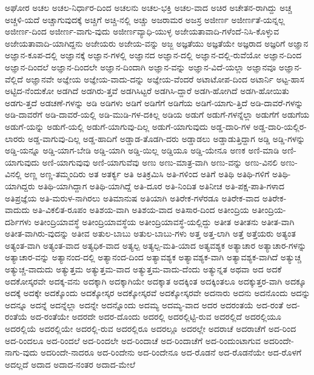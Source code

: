{ಅಘೋರ
ಅಚಲ
ಅಚಲ-ನಿರ್ಧಾರ-ದಿಂದ
ಅಚಲನು
ಅಚಲ-ಭಕ್ತಿ
ಅಚಲ-ವಾದ
ಅಚಿರ
ಅಚೇತನ-ರಾಗಿದ್ದು
ಅಚ್ಚ
ಅಚ್ಚಳಿ-ಯದೆ
ಅಚ್ಚಾಗುವುದಕ್ಕೆ
ಅಚ್ಚಿಗೆ
ಅಚ್ಚಿ-ನಲ್ಲಿ
ಅಚ್ಚು
ಅಜರಾಮರ
ಅಜಸ್ರ
ಅಜೀರ್ಣ
ಅಜೀರ್ಣತೆ-ಯನ್ನಲ್ಲ
ಅಜೀರ್ಣ-ದಿಂದ
ಅಜೀರ್ಣ-ವಾಗು-ವುದು
ಅಜೀರ್ಣವ್ಯಾಧಿ-ಯುಳ್ಳ
ಅಜೇಯತಾವಾದಿ-ಗಳೆಂದೆ-ನಿಸಿ-ಕೊಳ್ಳುವ
ಅಜೇಯತಾವಾದಿ-ಯಾಗಿದ್ದನು
ಅಜೇಯರು
ಅಜೇಯ-ವನ್ನು
ಅಜ್ಜ
ಅಜ್ಞತೆಯು
ಅಜ್ಞತೆಯೇ
ಅಜ್ಞರಾದ
ಅಜ್ಞರಿಗೆ
ಅಜ್ಞಾನ
ಅಜ್ಞಾನ-ಕೂಪ-ದಲ್ಲಿ
ಅಜ್ಞಾನಕ್ಕೆ
ಅಜ್ಞಾನ-ಗಳಲ್ಲಿ
ಅಜ್ಞಾನದ
ಅಜ್ಞಾನ-ದಲ್ಲಿ
ಅಜ್ಞಾನ-ದಲ್ಲಿ-ರುವೆಯೋ
ಅಜ್ಞಾನ-ದಿಂದ
ಅಜ್ಞಾನ-ದಿಂದಲೆ
ಅಜ್ಞಾನ-ದಿಂದಲೇ
ಅಜ್ಞಾನ-ದಿಂದಾಗಿ
ಅಜ್ಞಾನ-ವನ್ನು
ಅಜ್ಞಾನ-ವಿದೆ-ಯಲ್ಲಾ
ಅಜ್ಞಾನವೂ
ಅಜ್ಞಾನ-ವೆಲ್ಲಿದೆ
ಅಜ್ಞಾನವೇ
ಅಜ್ಞೇಯ
ಅಜ್ಞೇಯ-ವಾದು-ದನ್ನು
ಅಜ್ಞೇಯ-ವೆಂದರೆ
ಅಟಾಟೋಪ-ದಿಂದ
ಅಟಾರ್ನಿ
ಅಟ್ಟ-ಹಾಸ
ಅಟ್ಟಿದ-ನೆಂದುಕೋ
ಅಡಗಿದೆ
ಅಡಗಿರು-ತ್ತವೆ
ಅಡಗಿಸಿಟ್ಟರೆ
ಅಡಗಿಸಿ-ದ್ದಾರೆ
ಅಡಗಿ-ಹೋಗಿದೆ
ಅಡಗಿ-ಹೋಯಿತು
ಅಡಗು-ತ್ತದೆ
ಅಡಚಣೆ-ಗಳನ್ನು
ಅಡಿ
ಅಡಿಗಳು
ಅಡಿಗೆ
ಅಡಿಗೆಗೆ
ಅಡಿಗೆಯ
ಅಡಿಗೆ-ಯಾಗು-ತ್ತಿದೆ
ಅಡಿ-ದಾವರೆ-ಗಳನ್ನು
ಅಡಿ-ದಾವರೆಗೆ
ಅಡಿ-ದಾವರೆ-ಯಲ್ಲಿ
ಅಡಿ-ಮುಡಿ-ಗಳ-ದಕಿಲ್ಲ
ಅಡಿಯ
ಅಡುಗೆ
ಅಡುಗೆ-ಗಳನ್ನೆಲ್ಲಾ
ಅಡುಗೆಗೆ
ಅಡುಗೆಯ
ಅಡುಗೆ-ಯನ್ನು
ಅಡುಗೆ-ಯಲ್ಲಿ
ಅಡುಗೆ-ಯಾಗುವು-ದಿಲ್ಲ
ಅಡುಗೆ-ಯಾಗುವುದು
ಅಡ್ಡ-ದಾರಿ-ಗಳ
ಅಡ್ಡ-ದಾರಿ-ಯಲ್ಲಿರ-ಲಾರರು
ಅಡ್ಡ-ವಾಗುವು-ದಿಲ್ಲ
ಅಡ್ಡ-ಹಾದಿಗೆ
ಅಡ್ಡಾಡ-ತೊಡಗಿ-ದರು
ಅಡ್ಡಾಡಲು
ಅಡ್ಡಾಡುತ್ತಿದ್ದಾಗ
ಅಡ್ಡಿ
ಅಡ್ಡಿ-ಗಳನ್ನು
ಅಡ್ಡಿ-ಯನ್ನೂ
ಅಡ್ಡಿ-ಯಾಗ-ಬೇಡಿ
ಅಡ್ಡಿ-ಯಾಗಿ
ಅಡ್ಡಿ-ಯಿಲ್ಲ
ಅಡ್ಡಿಯೂ
ಅಡ್ಡಿ-ಯೇನೂ
ಅಣಕ
ಅಣಿ-ಮಾಡಿ
ಅಣಿ-ಯಾಗುವುದು
ಅಣಿ-ಯಾಗುವುವು
ಅಣಿ-ಯಾಗುವೆವು
ಅಣು
ಅಣು-ಮಾತ್ರ-ವಾಗಿ
ಅಣು-ವನ್ನು
ಅಣು-ವಿನಲಿ
ಅಣು-ವಿನಲ್ಲಿ
ಅಣ್ಣ
ಅಣ್ಣ-ತಮ್ಮಂದಿರು
ಅತ
ಅತರ್ಕ್ಯ
ಅತಿ
ಅತಿಕ್ರಮಿಸಿ
ಅತಿ-ಗಳಿಂದ
ಅತಿಗೆ
ಅತಿಥಿ
ಅತಿಥಿ-ಗಳಿಗೆ
ಅತಿಥಿ-ಯಾಗಿದ್ದರು
ಅತಿಥಿ-ಯಾಗಿದ್ದಾಗ
ಅತಿಥಿ-ಯಾಗಿದ್ದೆ
ಅತಿ-ದೂರ
ಅತಿ-ನಿಂದಿತ
ಅತಿನೀಚ
ಅತಿ-ಪಕ್ಷ-ಪಾತಿ-ಗಳಾದ
ಅತಿಪ್ರಜ್ಞೆಯ
ಅತಿ-ಮರುಳ-ನಾಗಿರಲು
ಅತಿಮಾನುಷ
ಅತಿಯಾಗಿ
ಅತಿರೇಕ-ಗಳೆರಡೂ
ಅತಿರೇಕ-ವಾದ
ಅತಿರೇಕ-ವಾದುದು
ಅತಿ-ವಿಕಲಿತ-ರೂಪಂ
ಅತಿಶಯ-ವಾಗಿ
ಅತಿಶಯ-ವಾದ
ಅತಿಸಾರ-ದಿಂದ
ಅತೀಂದ್ರಿಯ
ಅತೀಂದ್ರಿಯ-ದರ್ಶಿಗಳು
ಅತೀಂದ್ರಿಯಾವಸ್ಥೆ
ಅತೀಂದ್ರಿಯಾವಸ್ಥೆಯ
ಅತೀಂದ್ರಿಯಾವಸ್ಥೆ-ಯಲ್ಲಿದ್ದು
ಅತೀತ
ಅತೀತನು
ಅತೀತ-ವಾಗಿ
ಅತೀತ-ವಾಗಿರು-ವುದನ್ನು
ಅತೀವ
ಅತುಲ-ಬಾಬು
ಅತುಲ-ಬಾಬು-ಗಳು
ಅತ್ತ
ಅತ್ತ-ಲಾಗಿ
ಅತ್ತೆ
ಅತ್ತೆಯರು
ಅತ್ಯಂತ
ಅತ್ಯಂತ-ವಾಗಿ
ಅತ್ಯಂತ-ವಾದ
ಅತ್ಯಧಿಕ-ವಾದ
ಅತ್ಯಲ್ಪ
ಅತ್ಯಲ್ಪ-ಮತಿ-ಯಾದ
ಅತ್ಯವಶ್ಯಕ
ಅತ್ಯಾಚಾರ
ಅತ್ಯಾಚಾರ-ಗಳನ್ನು
ಅತ್ಯಾಚಾರ-ವನ್ನು
ಅತ್ಯಾನಂದ-ದಲ್ಲಿ
ಅತ್ಯಾನಂದ-ದಿಂದ
ಅತ್ಯಾವಶ್ಯಕ
ಅತ್ಯಾವಶ್ಯಕ-ವಾಗಿ
ಅತ್ಯಾವಶ್ಯಕ-ವಾಗಿದೆ
ಅತ್ಯುಚ್ಚ
ಅತ್ಯುಚ್ಚ-ವಾದುದು
ಅತ್ಯುತ್ತಮ
ಅತ್ಯುತ್ತಮ-ವಾದ
ಅತ್ಯುತ್ತಮ-ವಾದು-ದೆಂದು
ಅತ್ಯುನ್ನತ
ಅಥವಾ
ಅದ
ಅದಕೆ
ಅದಕೋಸ್ಕರವೇ
ಅದಕ್ಕ-ವನು
ಅದಕ್ಕಾಗಿ
ಅದಕ್ಕಾಗಿಯೇ
ಅದಕ್ಕಾತ
ಅದಕ್ಕಿಂತ
ಅದಕ್ಕಿಂತಲೂ
ಅದಕ್ಕುತ್ತರ-ವಾಗಿ
ಅದಕ್ಕೂ
ಅದಕ್ಕೆ
ಅದಕ್ಕೇ
ಅದಕ್ಕೊಂದು
ಅದಕ್ಕೋಸ್ಕರ
ಅದಕ್ಕೋಸ್ಕರವೆ
ಅದಕ್ಕೋಸ್ಕರವೇ
ಅದನಾರು
ಅದನು
ಅದನೊಂದು
ಅದನ್ನು
ಅದನ್ನೂ
ಅದನ್ನೆ
ಅದನ್ನೆಲ್ಲಾ
ಅದನ್ನೇ
ಅದನ್ನೊಂದು
ಅದಮ್ಯ
ಅದಮ್ಯ-ವಾದ
ಅದರ
ಅದರಂತಯೆ
ಅದ-ರಂತೆ
ಅದ-ರಂತೆಯೆ
ಅದ-ರಂತೆಯೇ
ಅದರದೇ
ಅದರ-ದೊಂದು
ಅದರಲ್ಲಿ
ಅದರಲ್ಲಿಟ್ಟಿ-ರುವ
ಅದರಲ್ಲಿದೆ
ಅದರಲ್ಲಿಯೂ
ಅದರಲ್ಲಿಯೆ
ಅದರಲ್ಲಿಯೇ
ಅದರಲ್ಲಿ-ರುವ
ಅದರಲ್ಲಿರೂ
ಅದರಲ್ಲೂ
ಅದರಲ್ಲೇ
ಅದರಾಚೆ
ಅದರಾಚೆಗೆ
ಅದ-ರಿಂದ
ಅದ-ರಿಂದಲೂ
ಅದ-ರಿಂದಲೆ
ಅದ-ರಿಂದಲೇ
ಅದ-ರಿಂದಾಚೆ
ಅದ-ರಿಂದಾಚೆಗೆ
ಅದ-ರಿಂದುಂಟಾಗುವ
ಅದರಿಂದೇ-ನಾಗು-ವುದು
ಅದರಿಂದೇ-ನಾದರೂ
ಅದ-ರಿಂದೇನು
ಅದ-ರಿಂದೇನೂ
ಅದ-ರೊಡನೆ
ಅದ-ರೊಡನೆಯೇ
ಅದ-ರೊಳಗೆ
ಅದಲ್ಲದೆ
ಅದಾದ
ಅದಾದ-ನಂತರ
ಅದಾದ-ಮೇಲೆ
}
